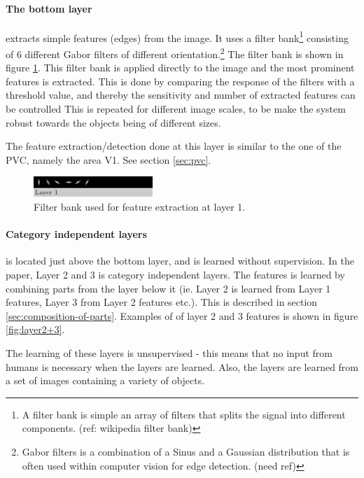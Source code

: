 \paragraph*{The bottom layer} extracts simple features (edges) from the image. It uses a filter bank\footnote{A filter bank is simple an array of filters that splits the signal into different components. (ref: wikipedia filter bank)}
 consisting of 6 different Gabor filters of different orientation.\footnote{Gabor filters is a combination of a Sinus and a Gaussian distribution that is often used within computer vision for edge detection. (need ref)} 
The filter bank is shown in figure \ref{fig:filterbank}. 
This filter bank is applied directly to the image and the most prominent features is extracted. 
This is done by comparing the response of the filters with a threshold value, and thereby the sensitivity and number of extracted features can be controlled
This is repeated for different image scales, to be make the system robust towards the objects being of different sizes. 


The feature extraction/detection done at this layer is similar to the one of the PVC, namely the area V1. See section \ref{sec:pvc}. 


\begin{figure}[h!] %
\centering
\includegraphics[width=0.4\textwidth]{graphics/layer1_features}
\caption{Filter bank used for feature extraction at layer 1.  
\cite[fig.~7]{fidler2009learning} }
\label{fig:filterbank}
\end{figure}

\paragraph*{Category independent layers} is located just above the bottom layer, and is learned without supervision. In the paper, Layer 2 and 3 is category independent layers.  The features is learned by combining parts from the layer below it (ie. Layer 2 is learned from Layer 1 features, Layer 3 from Layer 2 features etc.). This is described in section \ref{sec:composition-of-parts}. Examples of of layer 2 and 3 features is shown in figure \ref{fig:layer2+3}. 

The learning of these layers is unsupervised - this means that no input from humans is necessary when the layers are learned. Also, the layers are learned from a set of images containing a variety of objects. 


